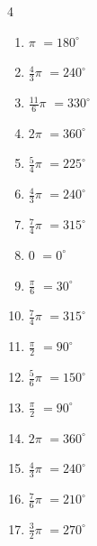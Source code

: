 \begin{multicols}{4}
\begin{enumerate}
  \item $\displaystyle \pi$
        $\displaystyle =180^{\circ}$

  \item $\displaystyle \frac{4}{3}\pi$
        $\displaystyle =240^{\circ}$

  \item $\displaystyle \frac{11}{6}\pi$
        $\displaystyle =330^{\circ}$

  \item $\displaystyle 2\pi$
        $\displaystyle =360^{\circ}$

  \item $\displaystyle \frac{5}{4}\pi$
        $\displaystyle =225^{\circ}$

  \item $\displaystyle \frac{4}{3}\pi$
        $\displaystyle =240^{\circ}$

  \item $\displaystyle \frac{7}{4}\pi$
        $\displaystyle =315^{\circ}$

  \item $\displaystyle 0$
        $\displaystyle =0^{\circ}$

  \item $\displaystyle \frac{\pi}{6}$
        $\displaystyle =30^{\circ}$

  \item $\displaystyle \frac{7}{4}\pi$
        $\displaystyle =315^{\circ}$

  \item $\displaystyle \frac{\pi}{2}$
        $\displaystyle =90^{\circ}$

  \item $\displaystyle \frac{5}{6}\pi$
        $\displaystyle =150^{\circ}$

  \item $\displaystyle \frac{\pi}{2}$
        $\displaystyle =90^{\circ}$

  \item $\displaystyle 2\pi$
        $\displaystyle =360^{\circ}$

  \item $\displaystyle \frac{4}{3}\pi$
        $\displaystyle =240^{\circ}$

  \item $\displaystyle \frac{7}{6}\pi$
        $\displaystyle =210^{\circ}$

  \item $\displaystyle \frac{3}{2}\pi$
        $\displaystyle =270^{\circ}$


\end{enumerate}
\end{multicols}
